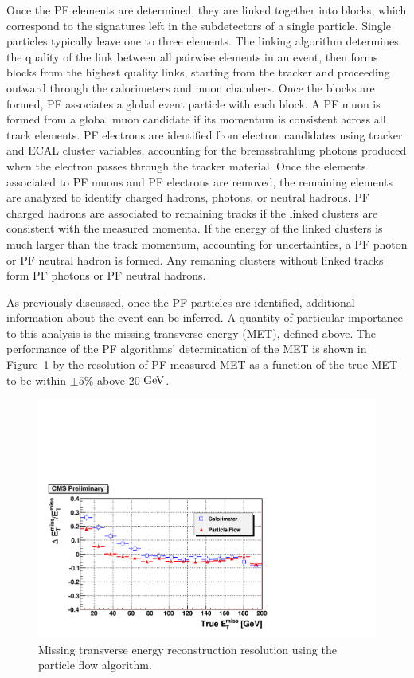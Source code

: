 \indent Once the PF elements are determined, they are linked together into blocks, which correspond to the signatures left in the subdetectors of a single particle. Single particles typically leave one to three elements. The linking algorithm determines the quality of the link between all pairwise elements in an event, then forms blocks from the highest quality links, starting from the tracker and proceeding outward through the calorimeters and muon chambers. Once the blocks are formed, PF associates a global event particle with each block. A PF muon is formed from a global muon candidate if its momentum is consistent across all track elements. PF electrons are identified from electron candidates using tracker and ECAL cluster variables, accounting for the bremsstrahlung photons produced when the electron passes through the tracker material. Once the elements associated to PF muons and PF electrons are removed, the remaining elements are analyzed to identify charged hadrons, photons, or neutral hadrons. PF charged hadrons are associated to remaining tracks if the linked clusters are consistent with the measured momenta. If the energy of the linked clusters is much larger than the track momentum, accounting for uncertainties, a PF photon or PF neutral hadron is formed. Any remaning clusters without linked tracks form PF photons or PF neutral hadrons. 

\indent As previously discussed, once the PF particles are identified, additional information about the event can be inferred. A quantity of particular importance to this analysis is the missing transverse energy (MET), defined above. The performance of the PF algorithms' determination of the MET is shown in Figure~\ref{fig:pfmetres} by the resolution of PF measured MET as a function of the true MET to be within $\pm5\%$ above 20 $\mathrm{Ge\kern -0.1em V}$.


\begin{figure}[tbh]
\centering
\includegraphics[width=4.5in]{figures/pfmetres.pdf}
\caption{Missing transverse energy reconstruction resolution using the particle flow algorithm.}
\label{fig:pfmetres}
\end{figure}

